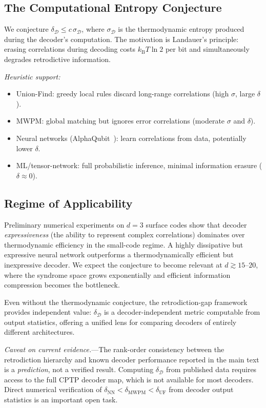 \documentclass[prl,twocolumn,superscriptaddress,longbibliography]{revtex4-2}
\newcommand{\kB}{k_{\mathrm{B}}}
\begin{document}
\subsection{The Computational Entropy Conjecture}

We conjecture $\delta_{\mathcal{D}} \leq c\,\sigma_{\mathcal{D}}$,
where $\sigma_{\mathcal{D}}$ is the thermodynamic entropy produced
during the decoder's computation. The motivation is Landauer's
principle: erasing correlations during decoding costs
$\kB T \ln 2$ per bit and simultaneously degrades retrodictive
information.

\emph{Heuristic support:}
\begin{itemize}
\item Union-Find: greedy local rules discard long-range correlations
  (high $\sigma$, large $\delta$).
\item MWPM: global matching but ignores error correlations
  (moderate $\sigma$ and $\delta$).
\item Neural networks (AlphaQubit~\cite{Bausch2024}): learn
  correlations from data, potentially lower $\delta$.
\item ML/tensor-network: full probabilistic inference,
  minimal information erasure ($\delta \approx 0$).
\end{itemize}

\subsection{Regime of Applicability}

Preliminary numerical experiments on $d = 3$ surface codes show that
decoder \emph{expressiveness} (the ability to represent complex
correlations) dominates over thermodynamic efficiency in the small-code
regime. A highly dissipative but expressive neural network outperforms
a thermodynamically efficient but inexpressive decoder. We expect the
conjecture to become relevant at $d \gtrsim 15$--$20$, where the
syndrome space grows exponentially and efficient information
compression becomes the bottleneck.

Even without the thermodynamic conjecture, the retrodiction-gap
framework provides independent value: $\delta_{\mathcal{D}}$ is a
decoder-independent metric computable from output statistics,
offering a unified lens for comparing decoders of entirely different
architectures.

\emph{Caveat on current evidence.}---The rank-order consistency
between the retrodiction hierarchy and known decoder performance
reported in the main text is a \emph{prediction}, not a verified
result. Computing $\delta_{\mathcal{D}}$ from published data requires
access to the full CPTP decoder map, which is not available for most
decoders. Direct numerical verification of
$\delta_{\mathrm{NN}} < \delta_{\mathrm{MWPM}} < \delta_{\mathrm{UF}}$
from decoder output statistics is an important open task.
\end{document}
